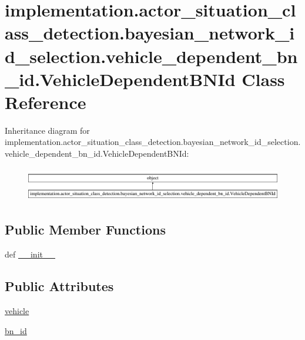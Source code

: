 \hypertarget{classimplementation_1_1actor__situation__class__detection_1_1bayesian__network__id__selection_1_7d108abdd10356de940cd9b1d03c64c8}{}\section{implementation.\+actor\+\_\+situation\+\_\+class\+\_\+detection.\+bayesian\+\_\+network\+\_\+id\+\_\+selection.\+vehicle\+\_\+dependent\+\_\+bn\+\_\+id.\+Vehicle\+Dependent\+B\+N\+Id Class Reference}
\label{classimplementation_1_1actor__situation__class__detection_1_1bayesian__network__id__selection_1_7d108abdd10356de940cd9b1d03c64c8}
Inheritance diagram for implementation.\+actor\+\_\+situation\+\_\+class\+\_\+detection.\+bayesian\+\_\+network\+\_\+id\+\_\+selection.\+vehicle\+\_\+dependent\+\_\+bn\+\_\+id.\+Vehicle\+Dependent\+B\+N\+Id\+:\begin{figure}[H]
\begin{center}
\leavevmode
\includegraphics[height=1.501341cm]{classimplementation_1_1actor__situation__class__detection_1_1bayesian__network__id__selection_1_7d108abdd10356de940cd9b1d03c64c8}
\end{center}
\end{figure}
\subsection*{Public Member Functions}
\begin{DoxyCompactItemize}
\item 
def \hyperlink{classimplementation_1_1actor__situation__class__detection_1_1bayesian__network__id__selection_1_7d108abdd10356de940cd9b1d03c64c8_a00dd01bd275214b4662ce974d7a75157}{\+\_\+\+\_\+init\+\_\+\+\_\+}
\end{DoxyCompactItemize}
\subsection*{Public Attributes}
\begin{DoxyCompactItemize}
\item 
\hyperlink{classimplementation_1_1actor__situation__class__detection_1_1bayesian__network__id__selection_1_7d108abdd10356de940cd9b1d03c64c8_ab48b413e32d9325b16f6479a87531fb1}{vehicle}
\item 
\hyperlink{classimplementation_1_1actor__situation__class__detection_1_1bayesian__network__id__selection_1_7d108abdd10356de940cd9b1d03c64c8_af0b1527030eee6ebb404fc0cc2b272ed}{bn\+\_\+id}
\end{DoxyCompactItemize}


